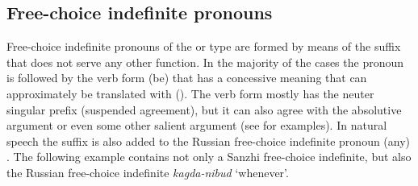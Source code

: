 
\subsection{Free-choice indefinite pronouns}
\label{ssec:Free-choice indefinite pronouns}

Free-choice indefinite pronouns of the  or  type are formed by means of the suffix  that does not serve any other function. In the majority of the cases the pronoun is followed by the verb form  (be) that has a concessive meaning that can approximately be translated with  (). The verb form  mostly has the neuter singular prefix  (suspended agreement), but it can also agree with the absolutive argument or even some other salient argument (see  for examples). In natural speech the suffix  is also added to the Russian free-choice indefinite pronoun  (any) . The following example  contains not only a Sanzhi free-choice indefinite, but also the Russian free-choice indefinite \textit{kagda-nibud} `whenever'.
%
